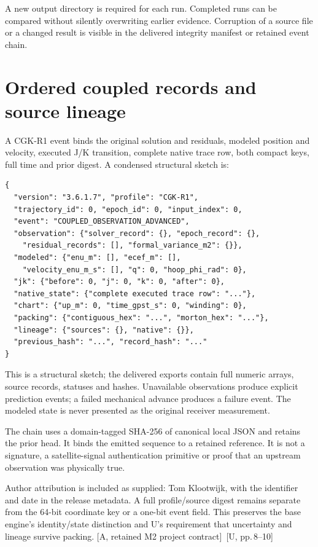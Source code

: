 \documentclass[11pt,a4paper]{article}
\newcommand{\src}[1]{\textcolor{muted}{[U, #1]}}
\newcommand{\base}{\textcolor{muted}{[A, retained M2 project contract]}}
\begin{document}
A new output directory is required for each run. Completed runs can be compared
without silently overwriting earlier evidence. Corruption of a source file or a
changed result is visible in the delivered integrity manifest or retained event chain.
\clearpage

\section{Ordered coupled records and source lineage}
A CGK-R1 event binds the original solution and residuals, modeled position and
velocity, executed J/K transition, complete native trace row, both compact keys,
full time and prior digest. A condensed structural sketch is:

\begin{lstlisting}
{
  "version": "3.6.1.7", "profile": "CGK-R1",
  "trajectory_id": 0, "epoch_id": 0, "input_index": 0,
  "event": "COUPLED_OBSERVATION_ADVANCED",
  "observation": {"solver_record": {}, "epoch_record": {},
    "residual_records": [], "formal_variance_m2": {}},
  "modeled": {"enu_m": [], "ecef_m": [],
    "velocity_enu_m_s": [], "q": 0, "hoop_phi_rad": 0},
  "jk": {"before": 0, "j": 0, "k": 0, "after": 0},
  "native_state": {"complete executed trace row": "..."},
  "chart": {"up_m": 0, "time_gpst_s": 0, "winding": 0},
  "packing": {"contiguous_hex": "...", "morton_hex": "..."},
  "lineage": {"sources": {}, "native": {}},
  "previous_hash": "...", "record_hash": "..."
}
\end{lstlisting}
This is a structural sketch; the delivered exports contain full numeric arrays,
source records, statuses and hashes. Unavailable observations produce explicit
prediction events; a failed mechanical advance produces a failure event. The
modeled state is never presented as the original receiver measurement.

The chain uses a domain-tagged SHA-256 of canonical local JSON and retains the prior
head. It binds the emitted sequence to a retained reference. It is not a signature,
a satellite-signal authentication primitive or proof that an upstream observation
was physically true.

Author attribution is included as supplied: Tom Klootwijk, with the identifier and
date in the release metadata. A full profile/source digest remains separate from the
64-bit coordinate key or a one-bit event field. This preserves the base engine's
identity/state distinction and U's requirement that uncertainty and lineage survive
packing. \base\ \src{pp.\,8--10}
\clearpage
\end{document}
